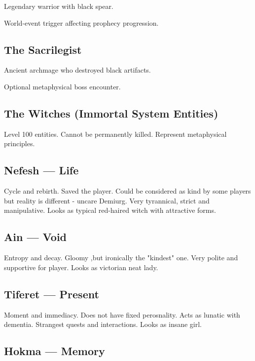 Legendary warrior with black spear.

World-event trigger affecting prophecy progression.



\subsection{The Sacrilegist}

Ancient archmage who destroyed black artifacts.

Optional metaphysical boss encounter.



\subsection{The Witches (Immortal System Entities)}

Level 100 entities. Cannot be permanently killed. Represent metaphysical principles.

\subsection{Nefesh — Life}

Cycle and rebirth. Saved the player. Could be considered as kind by some players but reality is different - uncare Demiurg. Very tyrannical, strict and manipulative. Looks as typical red-haired witch with attractive forms.

\subsection{Ain — Void}

Entropy and decay. Gloomy ,but ironically the "kindest" one. Very polite and supportive for player. Looks as victorian neat lady. 

\subsection{Tiferet — Present}

Moment and immediacy. Does not have fixed perosnality. Acts as lunatic with dementia. Strangest quests and interactions. Looks as insane girl.

\subsection{Hokma — Memory}

